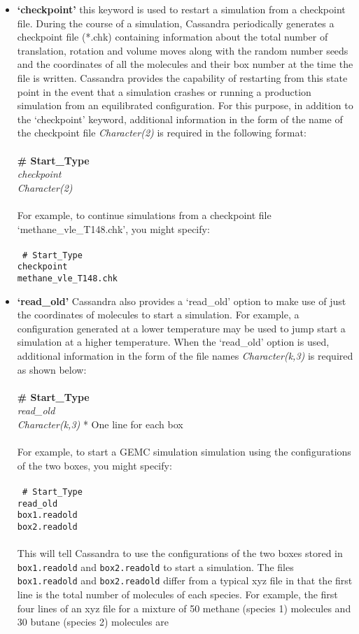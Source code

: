 \begin{itemize}
\item \textbf{`checkpoint'} this keyword is used to restart a simulation from a checkpoint file.
During the course of a simulation, Cassandra periodically generates a checkpoint file (*.chk)
 containing information about the total number of translation, rotation and volume moves along with the random number seeds and 
the coordinates of all the molecules and their box number at the time the file is written. Cassandra provides
the capability of restarting from this state point in the event that a simulation crashes or 
running a production simulation from an equilibrated configuration. For this
purpose, in addition to the `checkpoint' keyword, additional information in the form of the name of 
the checkpoint file {\it Character(2)} is required in the following format: \\ \\
%
{\bf \# Start\_Type} \\
{\it checkpoint} \\
{\it Character(2)} \\ \\
%
For example, to continue simulations from a checkpoint file `methane\_vle\_T148.chk', you might specify: \\ \\
%
\texttt{
\# Start\_Type \\
checkpoint \\
methane\_vle\_T148.chk \\ }
%
%
%
\item {\textbf{`read\_old'}} Cassandra also provides a `read\_old' option to make use of just the coordinates of molecules to start a simulation. 
For example, a configuration generated at a lower temperature may be used to jump start a simulation at a higher temperature. 
When the `read\_old' option is used, additional information in the form of the file names {\it Character(k,3)} is required as
shown below: \\ \\
%
{\bf \# Start\_Type} \\
{\it read\_old}\\
{\it Character(k,3)} * One line for each box \\ \\
%
For example, to start a GEMC simulation simulation using the configurations of the two boxes, you might specify: \\ \\
%
\texttt{
\# Start\_Type \\
read\_old \\
box1.readold \\ 
box2.readold \\ \\}
%
This will tell Cassandra to use the configurations of the two boxes stored in \texttt{box1.readold} and \texttt{box2.readold} to start a simulation. 
The files \texttt{box1.readold} and \texttt{box2.readold} differ from a typical xyz file in that the first line is the total number of molecules
of each species. For example, the first four lines of an xyz file for a mixture of 50 methane (species 1) molecules and 30 butane (species 2) molecules are\\


\end{itemize}
